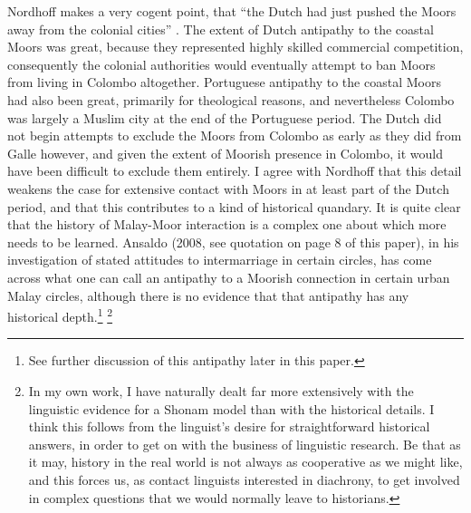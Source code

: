 Nordhoff makes a very cogent point, that ``the Dutch had just pushed the Moors away from the colonial cities'' \citep[37]{Nordhoff2009}. The extent of Dutch antipathy to the coastal Moors was great, because they represented highly skilled commercial competition, consequently the colonial authorities would eventually attempt to ban Moors from living in Colombo altogether. Portuguese antipathy to the coastal Moors had also been great, primarily for theological reasons, and nevertheless Colombo was largely a Muslim city at the end of the Portuguese period. The Dutch did not begin attempts to exclude the Moors from Colombo as early as they did from Galle however, and given the extent of Moorish presence in Colombo, it would have been difficult to exclude them entirely. I agree with Nordhoff that this detail weakens the case for extensive contact with Moors in at least part of the Dutch period, and that this contributes to a kind of historical quandary. It is quite clear that the history of Malay-Moor interaction is a complex one about which more needs to be learned. Ansaldo (2008, see quotation on page 8 of this paper), in his investigation of stated attitudes to intermarriage in certain circles, has come across what one can call an antipathy to a Moorish connection in certain urban Malay circles, although there is no evidence that that antipathy has any historical depth.\footnote{See
  further discussion of this antipathy later in this paper.
} 
\footnote{In
  my own work, I have naturally dealt far more extensively with the linguistic evidence for a Shonam model than with the historical details. I think this follows from the linguist's desire for straightforward historical answers, in order to get on with the business of linguistic research. Be that as it may, history in the real world is not always as cooperative as we might like, and this forces us, as contact linguists interested in diachrony, to get involved in complex questions that we would normally leave to historians.
}

